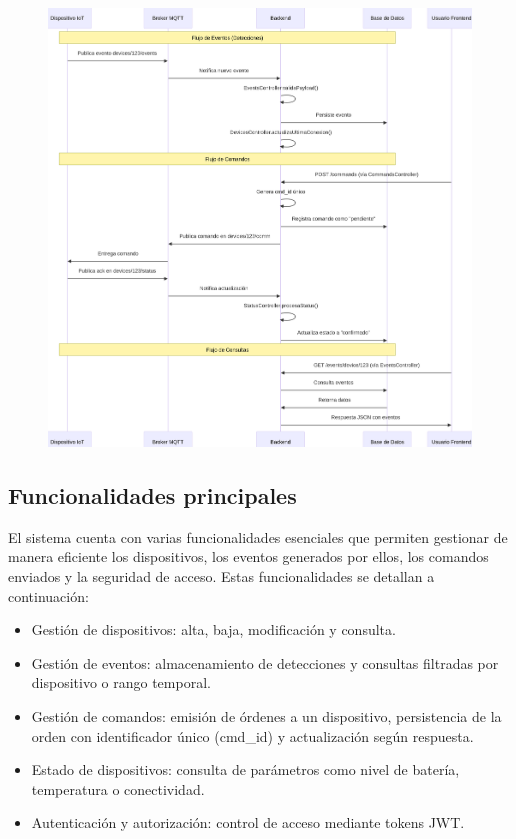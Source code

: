 \begin{figure}[H]
 
  \centering
  \includegraphics[width=1.02\linewidth]{./Figures/diagFlujoConexionBackend.png}
  \label{fig:diagrama_backend}
  \end{figure}

\FloatBarrier
\subsection{Funcionalidades principales}
El sistema cuenta con varias funcionalidades esenciales que permiten gestionar de manera eficiente los dispositivos, los eventos generados por ellos, los comandos enviados y la seguridad de acceso. Estas funcionalidades se detallan a continuación:

\begin{itemize}
    \item Gestión de dispositivos: alta, baja, modificación y consulta.
    \item Gestión de eventos: almacenamiento de detecciones y consultas filtradas por dispositivo o rango temporal.
    \item Gestión de comandos: emisión de órdenes a un dispositivo, persistencia de la orden con identificador único (cmd\_id) y actualización según respuesta.
    \item Estado de dispositivos: consulta de parámetros como nivel de batería, temperatura o conectividad.
    \item Autenticación y autorización: control de acceso mediante tokens JWT.
\end{itemize}


